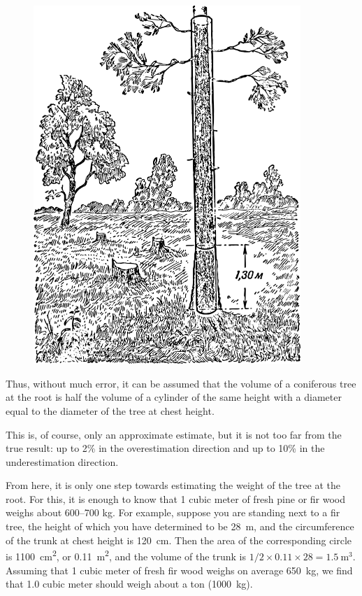 \begin{figure}[h!]
\centering
\includegraphics[width=0.9\textwidth]{figures/ch-01/fig-01-21.pdf}
\end{figure}

Thus, without much error, it can be assumed that the volume of a coniferous tree at the root is half the volume of a cylinder of the same height with a diameter equal to the diameter of the tree at chest height.

This is, of course, only an approximate estimate, but it is not too far from the true result: up to 2\% in the overestimation direction and up to 10\% in the underestimation direction.

From here, it is only one step towards estimating the weight of the tree at the root. For this, it is enough to know that 1 cubic meter of fresh pine or fir wood weighs about 600–700 kg. For example, suppose you are standing next to a fir tree, the height of which you have determined to be \SI{28}{\meter}, and the circumference of the trunk at chest height is \SI{120}{\centi\meter}. Then the area of the corresponding circle is \SI{1100}{\centi\meter\squared}, or \SI{0.11}{\meter\squared}, and the volume of the trunk is $1/2 \times 0.11 \times 28 = \SI{1.5}{\meter\cubed}$. Assuming that 1 cubic meter of fresh fir wood weighs on average \SI{650}{\kilo\gram}, we find that 1.0 cubic meter should weigh about a ton (\SI{1000}{\kilo\gram}).


